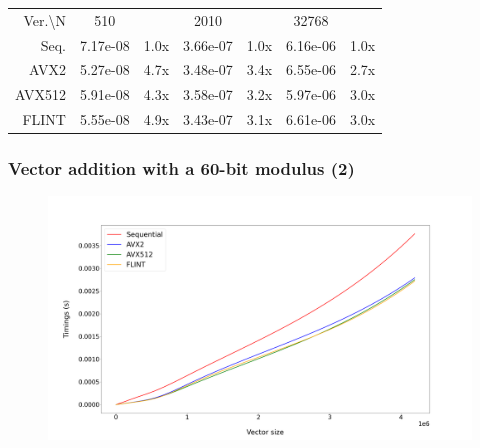 \documentclass[10pt]{beamer}
\begin{document}
\begin{frame}
\begin{table}[h!]
        \begin{tabular}{|r|*{3}{c c|}}
            \hline
            \rowcolor{myGray}
            \multicolumn{7}{|c|}{\textsc{Zen 4}} \\
            \hline
            \rowcolor{myGray}
            Ver.\textbackslash N & 510 & & 2010 & & 32768 & \\
            \hline
            \cellcolor{myGray} Seq. & 7.17e-08 & 1.0x & 3.66e-07 & 1.0x & 6.16e-06 & 1.0x \\
            \hline
            \cellcolor{myGray} AVX2 & 5.27e-08 & 4.7x & 3.48e-07 & 3.4x & 6.55e-06 & 2.7x \\
            \hline
            \cellcolor{myGray} AVX512 & 5.91e-08 & 4.3x & 3.58e-07 & 3.2x & 5.97e-06 & 3.0x \\
            \hline
            \cellcolor{myGray} FLINT & 5.55e-08 & 4.9x & 3.43e-07 & 3.1x & 6.61e-06 & 3.0x \\
            \hline
        \end{tabular}
    \end{table}
\end{frame}

\begin{frame}
    \frametitle{Vector addition with a 60-bit modulus (2)}

    \begin{figure}[h!]
        \begin{center}
            \includegraphics[width=1\textwidth]{add-mod_argiope.png}
        \end{center}
    \end{figure}
\end{frame}
\end{document}

